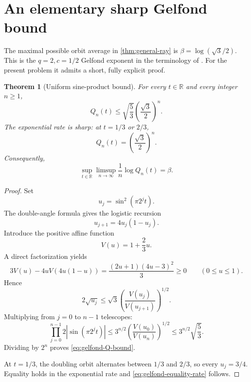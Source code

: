 \documentclass[11pt,oneside]{article}
\newtheorem{theorem}{Theorem}[section]
\theoremstyle{definition}
\theoremstyle{remark}
\newcommand{\R}{\mathbb R}
\begin{document}
\section{An elementary sharp Gelfond bound}
\label{sec:gelfond}

The maximal possible orbit average in \cref{thm:general-ray} is
\(\beta=\log(\sqrt3/2)\).  This is the \(q=2,c=1/2\) Gelfond exponent in the
terminology of \cite{fan2021}.  For the present problem it admits a short,
fully explicit proof.

\begin{theorem}[Uniform sine-product bound]
\label{thm:gelfond-bound}
For every \(t\in\R\) and every integer \(n\ge1\),
\begin{equation}
 Q_n(t)
 \le\sqrt{\frac53}\left(\frac{\sqrt3}{2}\right)^n.
 \label{eq:gelfond-Q-bound}
\end{equation}
The exponential rate is sharp: at \(t=1/3\) or \(2/3\),
\begin{equation}
 Q_n(t)=\left(\frac{\sqrt3}{2}\right)^n.
 \label{eq:gelfond-equality-rate}
\end{equation}
Consequently,
\begin{equation}
 \sup_{t\in\R}\limsup_{n\to\infty}\frac1n\log Q_n(t)
 =\beta.
 \label{eq:max-alpha-beta}
\end{equation}
\end{theorem}

\begin{proof}
Set
\[
 u_j=\sin^2(\pi2^j t).
\]
The double-angle formula gives the logistic recursion
\begin{equation}
 u_{j+1}=4u_j(1-u_j).
 \label{eq:logistic-recursion}
\end{equation}
Introduce the positive affine function
\[
 V(u)=1+\frac23u.
\]
A direct factorization yields
\begin{equation}
 3V(u)-4uV(4u(1-u))
 =\frac{(2u+1)(4u-3)^2}{3}\ge0
 \qquad(0\le u\le1).
 \label{eq:subaction-identity}
\end{equation}
Hence
\[
 2\sqrt{u_j}
 \le\sqrt3\left(\frac{V(u_j)}{V(u_{j+1})}\right)^{1/2}.
\]
Multiplying from \(j=0\) to \(n-1\) telescopes:
\[
 \prod_{j=0}^{n-1}2|\sin(\pi2^j t)|
 \le3^{n/2}\left(\frac{V(u_0)}{V(u_n)}\right)^{1/2}
 \le3^{n/2}\sqrt{\frac53}.
\]
Dividing by \(2^n\) proves \eqref{eq:gelfond-Q-bound}.

At \(t=1/3\), the doubling orbit alternates between \(1/3\) and \(2/3\), so
every \(u_j=3/4\).  Equality holds in the exponential rate and
\eqref{eq:gelfond-equality-rate} follows.
\end{proof}
\end{document}
